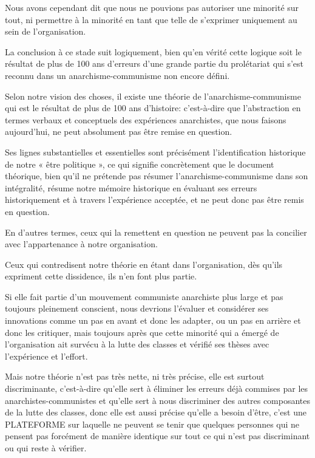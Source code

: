 Nous avons cependant dit que nous ne pouvions pas autoriser une minorité sur tout, ni permettre à la minorité en tant que telle de s'exprimer uniquement au sein de l'organisation.

La conclusion à ce stade suit logiquement, bien qu'en vérité cette logique soit le résultat de plus de 100 ans d'erreurs d'une grande partie du prolétariat qui s'est reconnu dans un anarchisme-communisme non encore défini.

Selon notre vision des choses, il existe une théorie de l'anarchisme-communisme qui est le résultat de plus de 100 ans d'histoire: c'est-à-dire que l'abstraction en termes verbaux et conceptuels des expériences anarchistes, que nous faisons aujourd'hui, ne peut absolument pas être remise en question.

Ses lignes substantielles et essentielles sont précisément l'identification historique de notre « être politique », ce qui signifie concrètement que le document théorique, bien qu'il ne prétende pas résumer l'anarchisme-communisme dans son intégralité, résume notre mémoire historique en évaluant ses erreurs historiquement et à travers l'expérience acceptée, et ne peut donc pas être remis en question.

En d'autres termes, ceux qui la remettent en question ne peuvent pas la concilier avec l'appartenance à notre organisation.

Ceux qui contredisent notre théorie en étant dans l'organisation, dès qu'ils expriment cette dissidence, ils n'en font plus partie.

Si elle fait partie d'un mouvement communiste anarchiste plus large et pas toujours pleinement conscient, nous devrions l'évaluer et considérer ses innovations comme un pas en avant et donc les adapter, ou un pas en arrière et donc les critiquer, mais toujours après que cette minorité qui a émergé de l'organisation ait survécu à la lutte des classes et vérifié ses thèses avec l'expérience et l'effort.

Mais notre théorie n'est pas très nette, ni très précise, elle est surtout discriminante, c'est-à-dire qu'elle sert à éliminer les erreurs déjà commises par les anarchistes-communistes et qu'elle sert à nous discriminer des autres composantes de la lutte des classes, donc elle est aussi précise qu'elle a besoin d'être, c'est une PLATEFORME sur laquelle ne peuvent se tenir que quelques personnes qui ne pensent pas forcément de manière identique sur tout ce qui n'est pas discriminant ou qui reste à vérifier.

